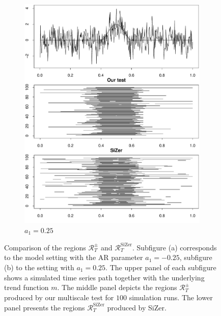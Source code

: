 \begin{figure}[t]
\begin{subfigure}{.5\textwidth}
\includegraphics[width=.9\linewidth]{Plots/min_int_with_T_500_a1_25.pdf}
\caption{$a_1 = 0.25$}
\end{subfigure}
\caption{Comparison of the regions $\mathcal{R}_T^\pm$ and $\mathcal{R}_T^{\text{SiZer}}$. Subfigure (a) corresponds to the model setting with the AR parameter $a_1 = -0.25$, subfigure (b) to the setting with $a_1 = 0.25$. The upper panel of each subfigure shows a simulated time series path together with the underlying trend function $m$. The middle panel depicts the regions $\mathcal{R}_T^\pm$ produced by our multiscale test for $100$ simulation runs. The lower panel presents the regions $\mathcal{R}_T^{\text{SiZer}}$ produced by SiZer.}  
\label{fig:comparison_SiZer}
\end{figure}


